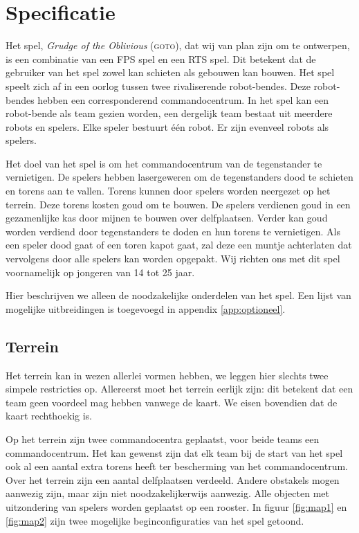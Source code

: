     \section{Specificatie}
    Het spel, \emph{Grudge of the Oblivious} (\textsc{goto}), dat wij van plan zijn om te ontwerpen, is een combinatie van een FPS spel en een RTS spel. Dit betekent dat de gebruiker van het spel zowel kan schieten als gebouwen kan bouwen. Het spel speelt zich af in een oorlog tussen twee rivaliserende robot-bendes. Deze robot-bendes hebben een corresponderend commandocentrum. In het spel kan een robot-bende als team gezien worden, een dergelijk team bestaat uit meerdere robots en spelers. Elke speler bestuurt \'e\'en robot. Er zijn evenveel robots als spelers.

    Het doel van het spel is om het commandocentrum van de tegenstander te vernietigen. De spelers hebben lasergeweren om de tegenstanders dood te schieten en torens aan te vallen. Torens kunnen door spelers worden neergezet op het terrein. Deze torens kosten goud om te bouwen. De spelers verdienen goud in een gezamenlijke kas door mijnen te bouwen over delfplaatsen. Verder kan goud worden verdiend door tegenstanders te doden en hun torens te vernietigen. Als een speler dood gaat of een toren kapot gaat, zal deze een muntje achterlaten dat vervolgens door alle spelers kan worden opgepakt. Wij richten ons met dit spel voornamelijk op jongeren van 14 tot 25 jaar.

    Hier beschrijven we alleen de noodzakelijke onderdelen van het spel. Een lijst van mogelijke uitbreidingen is toegevoegd in appendix \ref{app:optioneel}.

	\subsection{Terrein}
    Het terrein kan in wezen allerlei vormen hebben, we leggen hier slechts twee simpele restricties op. Allereerst moet het terrein eerlijk zijn: dit betekent dat een team geen voordeel mag hebben vanwege de kaart. We eisen bovendien dat de kaart rechthoekig is.

    Op het terrein zijn twee commandocentra geplaatst, voor beide teams een commandocentrum. Het kan gewenst zijn dat elk team bij de start van het spel ook al een aantal extra torens heeft ter bescherming van het commandocentrum. Over het terrein zijn een aantal delfplaatsen verdeeld. Andere obstakels mogen aanwezig zijn, maar zijn niet noodzakelijkerwijs aanwezig. Alle objecten met uitzondering van spelers worden geplaatst op een rooster. In figuur \ref{fig:map1} en \ref{fig:map2} zijn twee mogelijke beginconfiguraties van het spel getoond.


